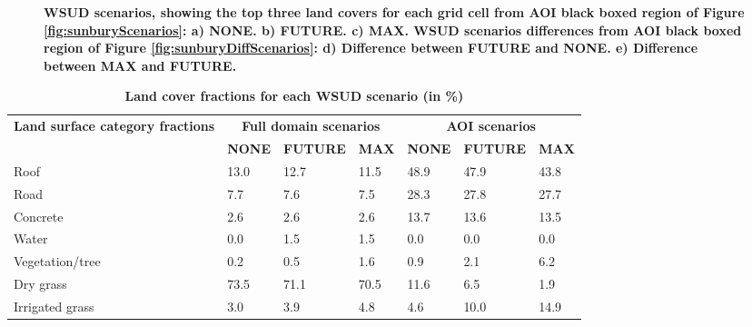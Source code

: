 \documentclass[final,3p,times,authoryear]{elsarticle}
\begin{document}
\begin{figure}[!htbp]
\begin{center}
\end{center}
\caption{\bf WSUD scenarios, showing the top three land covers for each grid cell from AOI black boxed region of Figure \ref{fig:sunburyScenarios}: a) NONE. b) FUTURE. c) MAX. WSUD scenarios differences from AOI black boxed region of Figure \ref{fig:sunburyDiffScenarios}: d) Difference between FUTURE and NONE. e) Difference between MAX and FUTURE.}    
 \label{fig:sunburyScenariosAOI} 
\end{figure} 


\begin{table}[!htbp]
\caption{\bf Land cover fractions for each WSUD scenario (in \%) \label{tab:parameters}}     
\begin{tabular}{ l l l l l l l}
  \hline  \textbf{Land surface category fractions } &  \multicolumn{3}{|c|}{\textbf{Full domain scenarios}} & \multicolumn{3}{c|}{\textbf{AOI scenarios}}  \\ 
\textbf{} & \textbf{NONE} & \textbf{FUTURE}  & \textbf{MAX} & \textbf{NONE} & \textbf{FUTURE}  & \textbf{MAX} \\ \hline
Roof  & 	13.0&		12.7&	11.5&	48.9&		47.9&	43.8 \\ 
Road  & 7.7&	7.6&	7.5	&	28.3&		27.8&	27.7 \\ 
Concrete  & 	2.6&	2.6&	2.6	&	13.7&		13.6&	13.5 \\ 
Water  & 	0.0&	1.5&	1.5	&	0.0&		0.0&	0.0	 \\ 
Vegetation/tree  & 	0.2&	0.5&	1.6	&	0.9&		2.1&	6.2	 \\ 
Dry grass  & 73.5&	71.1&	70.5&		11.6&		6.5&	1.9	 \\ 
Irrigated grass  & 	3.0	&	3.9&	4.8	&	4.6&	10.0&	14.9 \\ 
\hline
\end{tabular}
\end{table}
\end{document}
